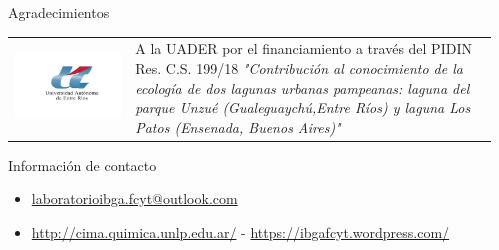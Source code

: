 \documentclass[final]{beamer}
\newlength{\sepmargin}
\newlength{\onecolwid}
\begin{document}
\begin{frame}[t]
      \begin{columns}[t] %
      
      \begin{column}{\sepmargin} \end{column}
        \begin{column}{\onecolwid} %
			\begin{block}{\large Agradecimientos}
                    \begin{center}
						\begin{tabular}{SL}
							\includegraphics[width=\linewidth]{uader.jpg}  &
							\footnotesize A la UADER por el financiamiento a través del PIDIN Res. C.S. 199/18 \textit{"Contribución al conocimiento de la ecología de dos lagunas urbanas pampeanas: laguna del parque Unzué (Gualeguaychú,Entre Ríos) y laguna Los Patos (Ensenada, Buenos Aires)"}
						\end{tabular}
					\end{center}
				\end{block}	
                \vspace*{-0.9cm}

				\begin{alertblock}{\large Información de contacto}
                \vspace*{-0.5cm}
					\begin{footnotesize}
					\begin{itemize}
						\item \href{mailto:email@meduniwien.ac.at}{laboratorioibga.fcyt@outlook.com}
						\item \href{http://cima.quimica.unlp.edu.ar//}{http://cima.quimica.unlp.edu.ar/} - \href{https://ibgafcyt.wordpress.com}{https://ibgafcyt.wordpress.com/}
					\end{itemize}
					\end{footnotesize}	
					

\end{alertblock}
\end{column}
\end{columns}
\end{frame}
\end{document}
